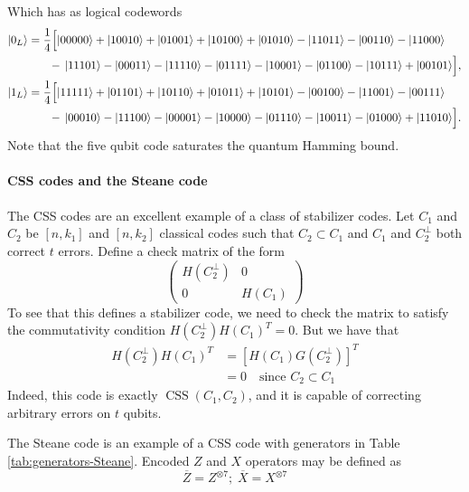 \documentclass[11pt,a4paper]{article}
\theoremstyle{definition}
\theoremstyle{plain}
\theoremstyle{remark}
\begin{document}
Which has as logical codewords 
\begin{align}
\lvert0_L\rangle &= \frac{1}{4}\Bigl[
   \lvert00000\rangle + \lvert10010\rangle + \lvert01001\rangle + \lvert10100\rangle
   + \lvert01010\rangle - \lvert11011\rangle - \lvert00110\rangle - \lvert11000\rangle\notag\\
 &\quad\;\;\;
   -\,\lvert11101\rangle - \lvert00011\rangle - \lvert11110\rangle - \lvert01111\rangle
   - \lvert10001\rangle - \lvert01100\rangle - \lvert10111\rangle + \lvert00101\rangle
\Bigr],\\
\lvert1_L\rangle &= \frac{1}{4}\Bigl[
   \lvert11111\rangle + \lvert01101\rangle + \lvert10110\rangle + \lvert01011\rangle
   + \lvert10101\rangle - \lvert00100\rangle - \lvert11001\rangle - \lvert00111\rangle\notag\\
 &\quad\;\;\;
   -\,\lvert00010\rangle - \lvert11100\rangle - \lvert00001\rangle - \lvert10000\rangle
   - \lvert01110\rangle - \lvert10011\rangle - \lvert01000\rangle + \lvert11010\rangle
\Bigr].
\end{align}
Note that the five qubit code saturates the quantum Hamming bound. 

\paragraph{CSS codes and the Steane code} 
The CSS codes are an excellent example of a class of stabilizer codes. Let $C_1$ and $C_2$ be 
$[n,k_1]$ and $[n,k_2]$ classical codes such that $C_2 \subset C_1$ and $C_1$ and $C_2^\perp$ both 
correct $t$ errors. Define a check matrix of the form 
$$\begin{pmatrix}
  H(C_2^\perp) & 0 \\
  0 & H(C_1)
\end{pmatrix}$$
To see that this defines a stabilizer code, we need to check the matrix to satisfy the commutativity 
condition $H(C_2^\perp) H(C_1)^T = 0$. But we have that 
\begin{align}
  H(C_2^\perp) H(C_1)^T &= [H(C_1)G(C_2^\perp)]^T \\
  &= 0 \quad \text{since $C_2 \subset C_1$}
\end{align}
Indeed, this code is exactly $\operatorname{CSS}(C_1, C_2)$, and it is capable of correcting arbitrary errors on $t$ qubits. 

The Steane code is an example of a CSS code with generators in Table \ref{tab:generators-Steane}. Encoded $Z$ and $X$ operators 
may be defined as 
$$\overline{Z} = Z^{\otimes 7}; \; \overline{X} = X^{\otimes 7}$$
\end{document}
